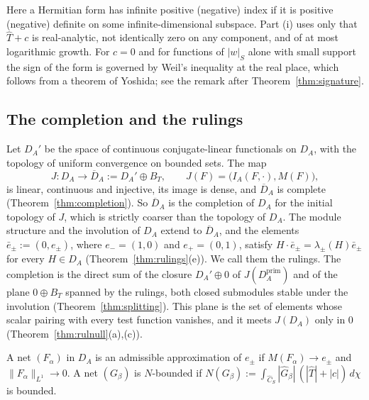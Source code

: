 \documentclass[11pt]{amsart}
\theoremstyle{definition}
\theoremstyle{remark}
\begin{document}
Here a Hermitian form has infinite positive (negative) index if it is
positive (negative) definite on some infinite-dimensional subspace.  Part (i)
uses only that $\widehat T+c$ is real-analytic, not identically zero on any
component, and of at most logarithmic growth.  For $c=0$ and for functions of
$|w|_S$ alone with small support the sign of the form is governed by Weil's
inequality at the real place, which follows from a theorem of Yoshida; see
the remark after
Theorem~\ref{thm:signature}.

\subsection*{The completion and the rulings}

Let $D_A'$ be the space of continuous conjugate-linear functionals on $D_A$,
with the topology of uniform convergence on bounded sets.  The map
\[
J:D_A\longrightarrow\overline{D}_A:=D_A'\oplus B_T,\qquad
J(F)=\bigl(I_A(F,\cdot),M(F)\bigr),
\]
is linear, continuous and injective, its image is dense, and $\overline{D}_A$
is complete (Theorem~\ref{thm:completion}).  So $\overline{D}_A$ is the
completion of $D_A$ for the initial topology of $J$, which is strictly
coarser than the topology of $D_A$.  The module structure and the involution
of $D_A$ extend to $\overline{D}_A$, and the elements
$\bar e_{\pm}:=(0,e_{\pm})$, where $e_-=(1,0)$ and $e_+=(0,1)$, satisfy
$H\cdot\bar e_{\pm}=\lambda_{\pm}(H)\bar e_{\pm}$ for every $H\in D_A$
(Theorem~\ref{thm:rulings}(e)).  We call them the rulings.  The completion is
the direct sum of the closure $D_A'\oplus0$ of $J(D_A^{\mathrm{prim}})$ and of
the plane $0\oplus B_T$ spanned by the rulings, both closed submodules stable
under the involution (Theorem~\ref{thm:splitting}).  This plane is the set of
elements whose scalar pairing with every test function vanishes, and it meets
$J(D_A)$ only in $0$ (Theorem~\ref{thm:rulnull}(a),(c)).

A net $(F_{\alpha})$ in $D_A$ is an admissible approximation of $e_{\pm}$ if
$M(F_{\alpha})\to e_{\pm}$ and $\lVert F_{\alpha}\rVert_{L^{1}}\to0$.  A net
$(G_{\beta})$ is $N$-bounded if
$N(G_{\beta}):=\int_{\widehat C_S}|\widehat G_{\beta}|\,(|\widehat T|+|c|)\,
d\chi$ is bounded.
\end{document}
